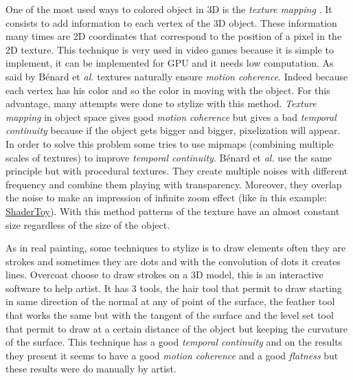 One of the most used ways to colored object in 3D is the \textit{texture mapping} \cite{texture_mapping}. It consists to add information to each vertex of the 3D object. These information many times are 2D coordinates that correspond to the position of a pixel in the 2D texture. This technique is very used in video games because it is simple to implement, it can be implemented for GPU and it needs low computation. As said by Bénard et \textit{al.} \cite{benard_dynamic_2009} textures naturally ensure \textit{motion coherence}. Indeed because each vertex has his color and so the color in moving with the object. For this advantage, many attempts were done to stylize with this method\cite{praun_real-time_2001, klein_non-photorealistic_2000, benard_dynamic_2009, benard_dynamic_2010}. \textit{Texture mapping} in object space gives good \textit{motion coherence} but gives a bad \textit{temporal continuity} because if the object gets bigger and bigger, pixelization will appear. In order to solve this problem some\cite{klein_non-photorealistic_2000, benard_dynamic_2009} tries to use mipmaps (combining multiple scales of textures) to improve \textit{temporal continuity}. Bénard et \textit{al.}\cite{benard_dynamic_2010} use the same principle but with procedural textures. They create multiple noises with different frequency and combine them playing with transparency. Moreover, they overlap the noise to make an impression of infinite zoom effect (like in this example: \href{https://www.shadertoy.com/view/XlBXWw?fbclid=IwAR1fU2JxQzXtks1ZcmVmzrHiv646G8w2gWceeiV-UToeFkAFMQ2NecbsGGs}{ShaderToy}). With this method patterns of the texture have an almost constant size regardless of the size of the object.

\newpage


As in real painting, some techniques to stylize is to draw elements often they are strokes and sometimes they are dots and with the convolution of dots it creates lines. Overcoat\cite{schmid_overcoat:_2011} choose to draw strokes on a 3D model, this is an interactive software to help artist. It has 3 tools, the hair tool that permit to draw starting in same direction of the normal at any of point of the surface, the feather tool that works the same but with the tangent of the surface and the level set tool that permit to draw at a certain distance of the object but keeping the curvature of the surface. This technique has a good \textit{temporal continuity} and on the results they present it seems to have a good \textit{motion coherence} and a good \textit{flatness} but these results were do manually by artist.

